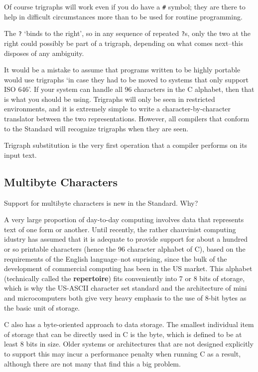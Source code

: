    Of course trigraphs will work even if you do have a
    \texttt{\#} symbol; they are there to help in difficult
    circumstances more than to be used for routine programming.


   The \texttt{?} `binds to the right', so in any sequence of
    repeated \texttt{?}s, only the two at the right could possibly be part
    of a trigraph, depending on what comes next--this disposes of any
    ambiguity.


   It would be a mistake to assume that programs written to be highly
    portable would use trigraphs `in case they had to be moved to systems
    that only support ISO 646'. If your system can handle all 96
    characters in the C alphabet, then that is what you should be using.
    Trigraphs will only be seen in restricted environments, and it is
    extremely simple to write a character-by-character translator between the
    two representations. However, all compilers that conform to the Standard
    will recognize trigraphs when they are seen.


   Trigraph substitution is the very first operation that a compiler
    performs on its input text.


  

  \subsection{Multibyte Characters}
   

   Support for multibyte characters is new in the Standard. Why?


   A very large proportion of day-to-day computing involves data that
    represents text of one form or another. Until recently, the rather
    chauvinist computing idustry has assumed that it is adequate to provide
    support for about a hundred or so printable characters (hence the
    96 character alphabet of C), based on the requirements of the
    English language--not suprising, since the bulk of the development
    of commercial computing has been in the US market. This alphabet
    (technically called the \textbf{repertoire}) fits conveniently into 7 or
    8 bits of storage, which is why the US-ASCII character set standard
    and the architecture of mini and microcomputers both give very heavy
    emphasis to the use of 8-bit bytes as the basic unit of storage.


   C also has a byte-oriented approach to data storage. The smallest
    individual item of storage that can be directly used in C is the byte,
    which is defined to be at least 8 bits in size. Older systems or
    architectures that are not designed explicitly to support this may incur a
    performance penalty when running C as a result, although there are not
    many that find this a big problem.


